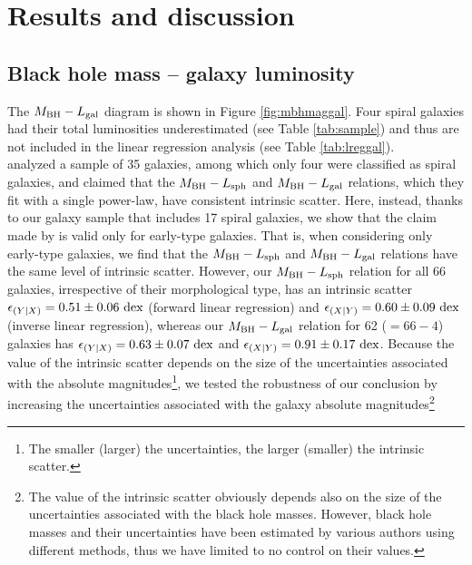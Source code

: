\documentclass[preprint2]{emulateapj}
\begin{document}
\section{Results and discussion}
\label{sec:res}

\subsection{Black hole mass -- galaxy luminosity}
The $M_{\rm BH} - L_{\rm gal}$ diagram is shown in Figure \ref{fig:mbhmaggal}.
Four spiral galaxies had their total luminosities underestimated (see Table \ref{tab:sample}) 
and thus are not included in the linear regression analysis (see Table \ref{tab:lreggal}). \\
\cite{lasker2014anal} analyzed a sample of 35 galaxies, among which only four were classified as spiral galaxies, 
and claimed that the $M_{\rm BH} - L_{\rm sph}$ and $M_{\rm BH} - L_{\rm gal}$ relations, 
which they fit with a single power-law, have consistent intrinsic scatter.
Here, instead, thanks to our galaxy sample that includes 17 spiral galaxies, 
we show that the claim made by \cite{lasker2014anal} is valid only for early-type galaxies. 
That is, when considering only early-type galaxies, 
we find that the $M_{\rm BH} - L_{\rm sph}$ and $M_{\rm BH} - L_{\rm gal}$ relations have the same level of intrinsic scatter. 
However, our $M_{\rm BH} - L_{\rm sph}$ relation for all 66 galaxies, irrespective of their morphological type, 
has an intrinsic scatter $\epsilon_{(Y|X)} = 0.51 \pm 0.06\rm~dex$ (forward linear regression) 
and $\epsilon_{(X|Y)} = 0.60 \pm 0.09\rm~dex$ (inverse linear regression), 
whereas our $M_{\rm BH} - L_{\rm gal}$ relation for 62 ($=66-4$) galaxies has $\epsilon_{(Y|X)} = 0.63 \pm 0.07\rm~dex$ 
and $\epsilon_{(X|Y)} = 0.91 \pm 0.17\rm~dex$.
Because the value of the intrinsic scatter depends on the size of the uncertainties associated with the absolute magnitudes\footnote{The 
smaller (larger) the uncertainties, the larger (smaller) the intrinsic scatter.}, 
we tested the robustness of our conclusion by increasing the uncertainties associated with the galaxy absolute magnitudes\footnote{The 
value of the intrinsic scatter obviously depends also on the size of the uncertainties associated with the black hole masses. 
However, black hole masses and their uncertainties have been estimated by various authors using different methods, 
thus we have limited to no control on their values.}  
\end{document}
